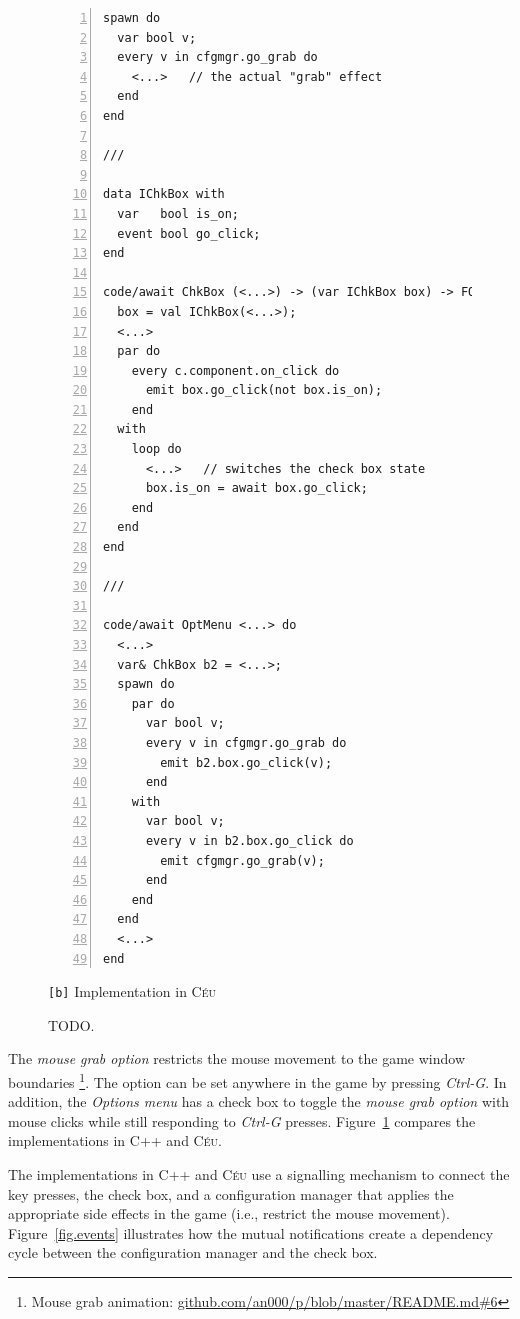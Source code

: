 \documentclass{vgtc}                          %
\newcommand{\CEU}{\textsc{C\'{e}u}\xspace}
\newcommand{\code}[1] {{\small{\texttt{#1}}}}
\newcommand{\bx}{\code{[b]}\xspace}
\begin{document}
\begin{figure}[t]
\begin{minipage}[t]{0.50\linewidth}
\begin{lstlisting}[numbers=left,xleftmargin=3em]
spawn do
  var bool v;
  every v in cfgmgr.go_grab do
    <...>   // the actual "grab" effect
  end
end

///

data IChkBox with
  var   bool is_on;
  event bool go_click;
end

code/await ChkBox (<...>) -> (var IChkBox box) -> FOREVER do
  box = val IChkBox(<...>);
  <...>
  par do
    every c.component.on_click do
      emit box.go_click(not box.is_on);
    end
  with
    loop do
      <...>   // switches the check box state
      box.is_on = await box.go_click;
    end
  end
end

///

code/await OptMenu <...> do
  <...>
  var& ChkBox b2 = <...>;
  spawn do
    par do
      var bool v;
      every v in cfgmgr.go_grab do
        emit b2.box.go_click(v);
      end
    with
      var bool v;
      every v in b2.box.go_click do
        emit cfgmgr.go_grab(v);
      end
    end
  end
  <...>
end
\end{lstlisting}
\centering\small{\bx Implementation in \CEU}
\end{minipage}
\caption{ TODO.
\label{lst.grab}
}
\end{figure}

The \emph{mouse grab option} restricts the mouse movement to the game window
boundaries%
\footnote{Mouse grab animation: \url{github.com/an000/p/blob/master/README.md#6} }.
The option can be set anywhere in the game by pressing \emph{Ctrl-G}.
In addition, the \emph{Options menu} has a check box to toggle the
\emph{mouse grab option} with mouse clicks while still responding to
\emph{Ctrl-G} presses.
%
Figure~\ref{lst.grab} compares the implementations in C++ and \CEU.

The implementations in C++ and \CEU use a signalling mechanism to connect the
key presses, the check box, and a configuration manager that applies the
appropriate side effects in the game (i.e., restrict the mouse movement).
Figure~\ref{fig.events} illustrates how the mutual notifications create a 
dependency cycle between the configuration manager and the check box.
\end{document}
